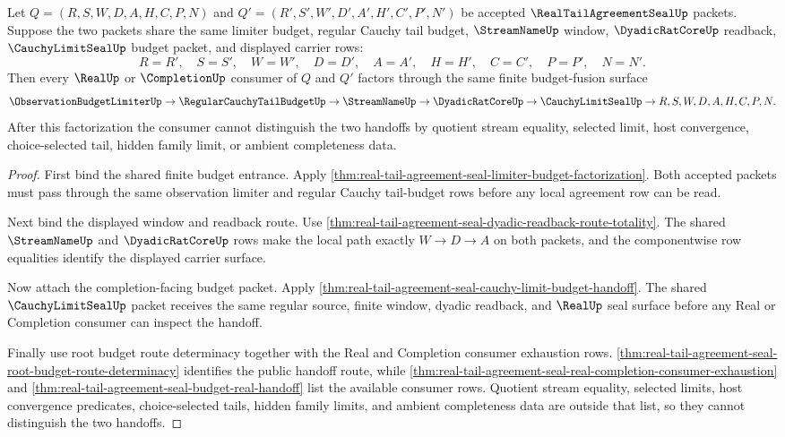 \begin{theorem}
\label{thm:real-tail-agreement-seal-budget-fusion-nonescape}
Let $Q=(R,S,W,D,A,H,C,P,N)$ and $Q'=(R',S',W',D',A',H',C',P',N')$ be accepted $\RealTailAgreementSealUp$ packets. Suppose the two packets share the same limiter budget, regular Cauchy tail budget, $\StreamNameUp$ window, $\DyadicRatCoreUp$ readback, $\CauchyLimitSealUp$ budget packet, and displayed carrier rows:
$$
R=R',\quad S=S',\quad W=W',\quad D=D',\quad A=A',\quad H=H',\quad C=C',\quad P=P',\quad N=N'.
$$
Then every $\RealUp$ or $\CompletionUp$ consumer of $Q$ and $Q'$ factors through the same finite budget-fusion surface
$$
\ObservationBudgetLimiterUp \to \RegularCauchyTailBudgetUp \to \StreamNameUp \to \DyadicRatCoreUp \to \CauchyLimitSealUp \to R,S,W,D,A,H,C,P,N.
$$
After this factorization the consumer cannot distinguish the two handoffs by quotient stream equality, selected limit, host convergence, choice-selected tail, hidden family limit, or ambient completeness data.
\end{theorem}
\begin{proof}
First bind the shared finite budget entrance. Apply \autoref{thm:real-tail-agreement-seal-limiter-budget-factorization}. Both accepted packets must pass through the same observation limiter and regular Cauchy tail-budget rows before any local agreement row can be read.

Next bind the displayed window and readback route. Use \autoref{thm:real-tail-agreement-seal-dyadic-readback-route-totality}. The shared $\StreamNameUp$ and $\DyadicRatCoreUp$ rows make the local path exactly $W \to D \to A$ on both packets, and the componentwise row equalities identify the displayed carrier surface.

Now attach the completion-facing budget packet. Apply \autoref{thm:real-tail-agreement-seal-cauchy-limit-budget-handoff}. The shared $\CauchyLimitSealUp$ packet receives the same regular source, finite window, dyadic readback, and $\RealUp$ seal surface before any Real or Completion consumer can inspect the handoff.

Finally use root budget route determinacy together with the Real and Completion consumer exhaustion rows. \autoref{thm:real-tail-agreement-seal-root-budget-route-determinacy} identifies the public handoff route, while \autoref{thm:real-tail-agreement-seal-real-completion-consumer-exhaustion} and \autoref{thm:real-tail-agreement-seal-budget-real-handoff} list the available consumer rows. Quotient stream equality, selected limits, host convergence predicates, choice-selected tails, hidden family limits, and ambient completeness data are outside that list, so they cannot distinguish the two handoffs.
\end{proof}

